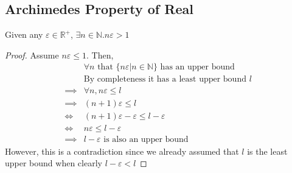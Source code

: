 \documentclass[a4paper]{article}
\theoremstyle{plain}
\newtheorem{thm}{Theorem}[section]
\theoremstyle{definition}
\theoremstyle{remark}
\begin{document}
\subsection{Archimedes Property of Real}
\begin{tcolorbox}[colback=black!3!white,colframe=black!60!white,title=\begin{thm}Archimedes Property of Reals \label{Archimedes Property of Reals}\end{thm}]
	Given any $\varepsilon \in \mathbb{R}^{+}$, $\exists n \in \mathbb{N} . n \varepsilon >1$ 
	\begin{proof}
		Assume $n \varepsilon \le 1$. Then,
		\begin{align}
			&\forall n \text{ that } \{ n \varepsilon | n \in \mathbb{N}\} \text{ has an upper bound} \\
			&\text{By completeness it has a least upper bound $l$} \\
			\implies& \forall n, n \varepsilon \le l \\
			\implies& (n+1) \varepsilon \le l \\
			\iff &(n+1)\varepsilon - \varepsilon \le l - \varepsilon\\
			\iff &n \varepsilon \le  l - \varepsilon \\
			\implies &l - \varepsilon \text{ is also an upper bound}
		\end{align}
		However, this is a contradiction since we already assumed that $l$ is the least upper bound when clearly $ l - \varepsilon < l$
	\end{proof}
\end{tcolorbox}
\end{document}
